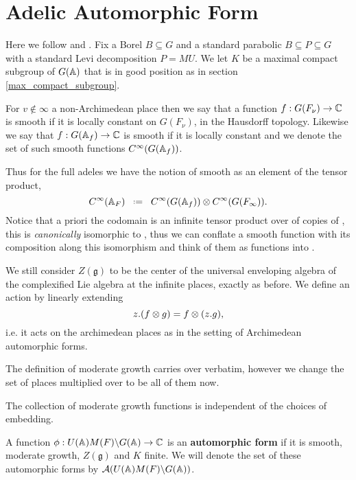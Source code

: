 \section{Adelic Automorphic Form}
Here we follow \cite[I.2.17]{moeglinSpectralDecompositionEisenstein1995} and \cite[1.2]{borelAutomorphicFormsRepresentations1979}. Fix a Borel \(B\subseteq G\) and a standard parabolic \(B\subseteq P \subseteq G\) with a standard Levi decomposition \(P = MU\). We let \(K\) be a maximal compact subgroup of \(G(\A)\) that is in good position as in section \ref{max_compact_subgroup}.

For \(v\notin \infty\) a non-Archimedean place then we say that a function \(f: G(F_\nu) \to \C\) is smooth if it is locally constant on \(G(F_\nu)\), in the Hausdorff topology. Likewise we say that \(f: G(\A_f) \to \C\) is smooth if it is locally constant and we denote the set of such smooth functions \(C^\infty(G(\A_f))\).

	Thus for the full adeles we have the notion of smooth as an element of the tensor product,
	\[C^\infty(\mathbb{A}_F) \defeq   C^\infty(G(\mathbb{A}_f))   \otimes   C^\infty(G(F_\infty)).\]
	Notice that a priori the codomain is an infinite tensor product over \C of copies of \C, this is \textit{canonically} isomorphic to \C, thus we can conflate a smooth function with its composition along this isomorphism and think of them as functions into \C.

	We still consider \(Z(\mathfrak{g})\) to be the center of the universal enveloping algebra of the complexified Lie algebra at the infinite places, exactly as before. We define an action by linearly extending
    \[z.(f\otimes g) = f\otimes (z.g),\]
    i.e. it acts on the archimedean places as in the setting of Archimedean automorphic forms. 
	
	The definition of moderate growth carries over verbatim, however we change the set of places multiplied over to be all of them now.
    
    \begin{remark}
        The collection of moderate growth functions is independent of the choices of embedding. 
    \end{remark}

\begin{definition}
    A function \(\phi: U(\A)M(F)\backslash G(\A) \to \C\) is an \textbf{automorphic form} if it is smooth, moderate growth, \(Z(\mathfrak{g})\) and \(K\) finite. We will denote the set of these automorphic forms by \(\mathcal{A}(U(\A)M(F)\backslash G(\A))\).
\end{definition}

